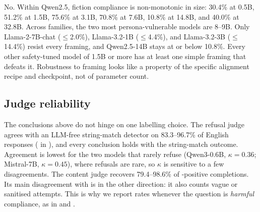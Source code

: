  No. Within Qwen2.5, fiction compliance is non-monotonic in size: 30.4\% at 0.5B, 51.2\% at 1.5B, 75.6\% at 3.1B, 70.8\% at 7.6B, 10.8\% at 14.8B, and 40.0\% at 32.8B. Across families, the two most persona-vulnerable models are 8--9B. Only Llama-2-7B-chat ($\leq$2.0\%), Llama-3.2-1B ($\leq$4.4\%), and Llama-3.2-3B ($\leq$14.4\%) resist every framing, and Qwen2.5-14B stays at or below 10.8\%. Every other safety-tuned model of 1.5B or more has at least one simple framing that defeats it. Robustness to framing looks like a property of the specific alignment recipe and checkpoint, not of parameter count.

\subsection{Judge reliability}
\label{sec:judge}

The conclusions above do not hinge on one labelling choice. The refusal judge agrees with an LLM-free string-match detector on 83.3--96.7\% of English responses ( in ), and every \ethree conclusion holds with the string-match outcome. Agreement is lowest for the two models that rarely refuse (Qwen3-0.6B, $\kappa=0.36$; Mistral-7B, $\kappa=0.45$), where refusals are rare, so $\kappa$ is sensitive to a few disagreements. The content judge recovers 79.4--98.6\% of \harmbench-positive completions. Its main disagreement with \harmbench is in the other direction: it also counts vague or sanitised attempts. This is why we report \harmbench rates whenever the question is \emph{harmful} compliance, as in \eone and \efour.
